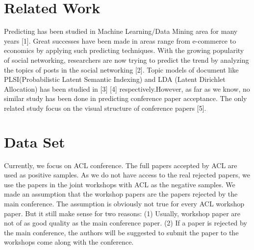 \documentclass[11pt,letterpaper]{article}
\begin{document}
\section{Related Work}

Predicting has been studied in Machine Learning/Data Mining area for many years [1]. Great successes have been made in areas range from e-commerce to economics by applying such predicting techniques. With the growing popularity of social networking, researchers are now trying to predict the trend by analyzing the topics of posts in the social networking [2]. Topic models of document like PLSI(Probabilistic Latent Semantic Indexing) and LDA (Latent Dirichlet Allocation) has been studied in [3] [4] respectively.However, as far as we know, no similar study has been done in predicting conference paper acceptance. The only related study focus on the visual structure of conference papers [5]. 



\section{Data Set}
Currently, we focus on ACL conference.
The full papers accepted by ACL are used as positive samples. 
As we do not have access to the real rejected papers, 
we use the papers in the joint workshops with ACL as the negative samples.
We made an assumption that the workshop papers are the papers rejected by the main conference.
The assumption is obviously not true for every ACL workshop paper.
But it still make sense for two reasons:
(1) Usually, workshop paper are not of as good quality as the main conference paper. 
(2) If a paper is rejected by the main conference, the authors will be suggested to submit the paper to the workshops come along with the conference.
\end{document}
